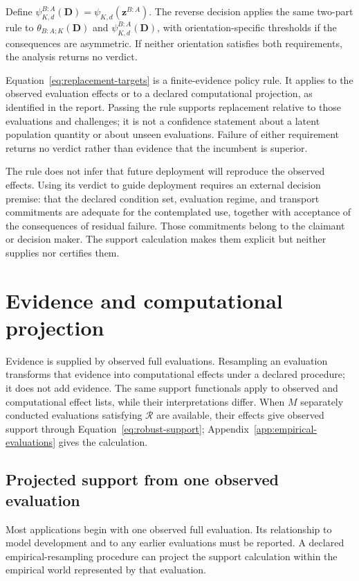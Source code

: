 \documentclass[11pt]{article}
\newcommand{\Regime}{\mathcal{R}}
\theoremstyle{remark}
\begin{document}
Define $\psi^{B:A}_{K,d}(\mathbf D)=\psi_{K,d}(\mathbf z^{B:A})$. The reverse decision applies the same two-part rule to $\theta_{B:A;K}(\mathbf D)$ and $\psi^{B:A}_{K,d}(\mathbf D)$, with orientation-specific thresholds if the consequences are asymmetric. If neither orientation satisfies both requirements, the analysis returns no verdict.

Equation~\eqref{eq:replacement-targets} is a finite-evidence policy rule. It
applies to the observed evaluation effects or to a declared computational
projection, as identified in the report. Passing the rule supports replacement
relative to those evaluations and challenges; it is not a confidence statement
about a latent population quantity or about unseen evaluations. Failure of
either requirement returns no verdict rather than evidence that the incumbent
is superior.

The rule does not infer that future deployment will reproduce the observed
effects. Using its verdict to guide deployment requires an external decision
premise: that the declared condition set, evaluation regime, and transport
commitments are adequate for the contemplated use, together with acceptance of
the consequences of residual failure. Those commitments belong to the claimant
or decision maker. The support calculation makes them explicit but neither
supplies nor certifies them.

\section{Evidence and computational projection}
\label{sec:evidence}

Evidence is supplied by observed full evaluations. Resampling an evaluation
transforms that evidence into computational effects under a declared procedure;
it does not add evidence. The same support functionals apply to observed and
computational effect lists, while their interpretations differ. When $M$
separately conducted evaluations satisfying $\Regime$ are available, their
effects give observed support through Equation~\eqref{eq:robust-support};
Appendix~\ref{app:empirical-evaluations} gives the calculation.

\subsection{Projected support from one observed evaluation}

Most applications begin with one observed full evaluation. Its relationship to model development and to any earlier evaluations must be reported. A declared empirical-resampling procedure can project the support calculation within the empirical world represented by that evaluation.
\end{document}
